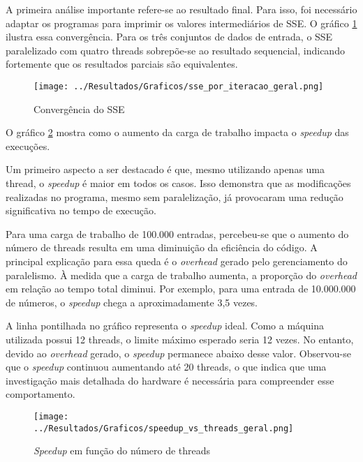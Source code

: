 A primeira análise importante refere-se ao resultado final. Para isso, foi necessário adaptar os programas para imprimir os valores intermediários de SSE. O gráfico \ref{fig: sse} ilustra essa convergência. Para os três conjuntos de dados de entrada, o SSE paralelizado com quatro threads sobrepõe-se ao resultado sequencial, indicando fortemente que os resultados parciais são equivalentes.

\begin{figure}[htbp!]
\centering
\texttt{[image: ../Resultados/Graficos/sse\_por\_iteracao\_geral.png]}
\caption{Convergência do SSE}
\label{fig: sse}
\end{figure}

O gráfico \ref{fig: speedup} mostra como o aumento da carga de trabalho impacta o \textit{speedup} das execuções.

\par Um primeiro aspecto a ser destacado é que, mesmo utilizando apenas uma thread, o \textit{speedup} é maior em todos os casos. Isso demonstra que as modificações realizadas no programa, mesmo sem paralelização, já provocaram uma redução significativa no tempo de execução.

\par Para uma carga de trabalho de 100.000 entradas, percebeu-se que o aumento do número de threads resulta em uma diminuição da eficiência do código. A principal explicação para essa queda é o \textit{overhead} gerado pelo gerenciamento do paralelismo. À medida que a carga de trabalho aumenta, a proporção do \textit{overhead} em relação ao tempo total diminui. Por exemplo, para uma entrada de 10.000.000 de números, o \textit{speedup} chega a aproximadamente 3,5 vezes.

\par A linha pontilhada no gráfico representa o \textit{speedup} ideal. Como a máquina utilizada possui 12 threads, o limite máximo esperado seria 12 vezes. No entanto, devido ao \textit{overhead} gerado, o \textit{speedup} permanece abaixo desse valor. Observou-se que o \textit{speedup} continuou aumentando até 20 threads, o que indica que uma investigação mais detalhada do hardware é necessária para compreender esse comportamento.

\begin{figure}[htbp!]
\centering
\texttt{[image: ../Resultados/Graficos/speedup\_vs\_threads\_geral.png]}
\caption{\textit{Speedup} em função do número de threads}
\label{fig: speedup}
\end{figure}

